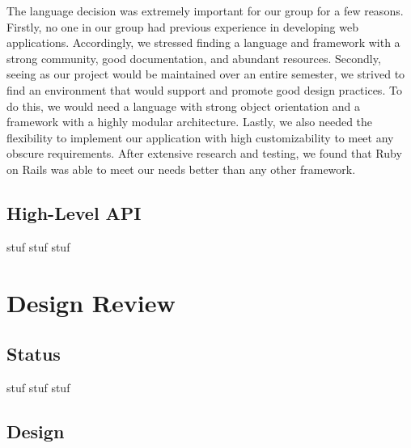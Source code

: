 \documentclass[11pt]{article}
\begin{document}

The language decision was extremely important for our group for a few reasons. Firstly, no one in our group had previous experience in developing web applications. Accordingly, we stressed finding a language and framework with a strong community, good documentation, and abundant resources. Secondly, seeing as our project would be maintained over an entire semester, we strived to find an environment that would support and promote good design practices. To do this, we would need a language with strong object orientation and a framework with a highly modular architecture. Lastly, we also needed the flexibility to implement our application with high customizability to meet any obscure requirements. After extensive research and testing, we found that Ruby on Rails was able to meet our needs better than any other framework. 



\subsection{High-Level API}

stuf stuf stuf

\section{Design Review}

\subsection{Status}

stuf stuf stuf

\subsection{Design}
\end{document}
